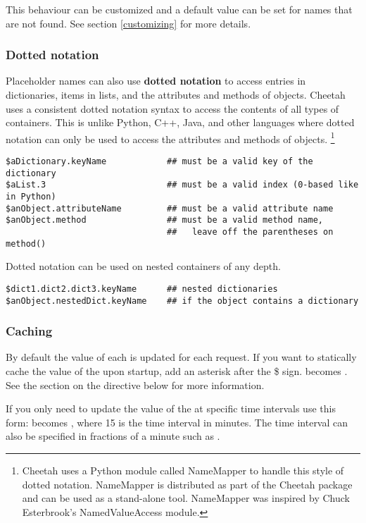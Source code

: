 \begin{enumerate}
This behaviour can be customized and a default value can be set for names
that are not found. See section \ref{customizing} for more details.

\subsubsection{Dotted notation}
Placeholder names can also use {\bf dotted notation} to access entries in
dictionaries, items in lists, and the attributes and methods of objects.
Cheetah uses a consistent dotted notation syntax to access the contents
of all types of containers.  This is unlike Python, C++, Java, and other
languages where dotted notation can only be used to access the attributes and
methods of objects. \footnote{Cheetah uses a Python module called
  NameMapper to handle this style of dotted notation.  NameMapper is distributed
  as part of the Cheetah package and can be used as a stand-alone tool.
  NameMapper was inspired by Chuck Esterbrook's NamedValueAccess module.}

\begin{verbatim}
$aDictionary.keyName            ## must be a valid key of the dictionary 
$aList.3                        ## must be a valid index (0-based like in Python)
$anObject.attributeName         ## must be a valid attribute name
$anObject.method                ## must be a valid method name, 
                                ##   leave off the parentheses on method()
\end{verbatim}


Dotted notation can be used on nested containers of any depth.
\begin{verbatim}
$dict1.dict2.dict3.keyName      ## nested dictionaries
$anObject.nestedDict.keyName    ## if the object contains a dictionary
\end{verbatim}


\subsubsection{Caching}

By default the value of each  is updated for each request.
If you want to statically cache the value of the  upon
startup, add an asterisk after the \$ sign.   becomes .
See the section on the  directive below for more information.

If you only need to update the value of the  at specific time intervals use
this form:  becomes  , where 15 is the time interval in
minutes.  The time interval can also be specified in fractions of a minute such
as .


\end{enumerate}
